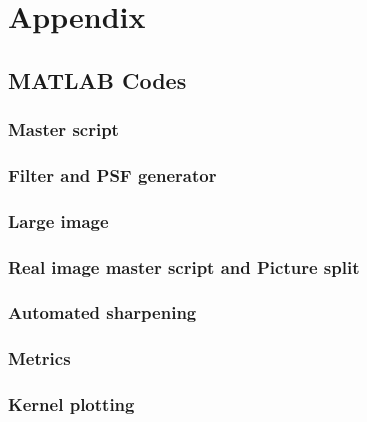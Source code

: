 \graphicspath{{mehul_pics/}}%

\section{Appendix}





\subsection{MATLAB Codes}

\subsubsection{Master script}


\subsubsection{Filter and PSF generator}



\subsubsection{Large image}


\subsubsection{Real image master script and Picture split}



\subsubsection{Automated sharpening}


\subsubsection{Metrics}





\subsubsection{Kernel plotting}

